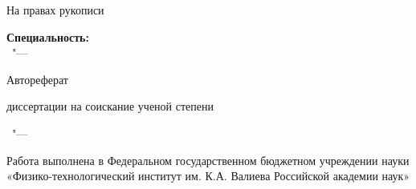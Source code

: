 \newcommand{\sfs}{\fontsize{14pt}{15pt}\selectfont}
\thispagestyle{empty}

\vspace{0pt plus1fill} %
\begin{flushright}
  \large{На правах рукописи}
\end{flushright}

\vspace{0pt plus3fill} %
\begin{center}
{\large \thesisAuthor}
\end{center}

\vspace{0pt plus3fill} %
\begin{center}
\textbf {\Large \thesisTitle}

\vspace{0pt plus3fill} %
\textbf {\large Специальность:} \\ 
{\large \thesisSpecialtyNumber\ "--- \thesisSpecialtyTitle}

\vspace{0pt plus1.5fill} %
\Large{Автореферат}\par
\large{диссертации на соискание ученой степени\par \thesisDegree}
\end{center}

\vspace{0pt plus4fill} %
\begin{center}
{\large{\thesisCity\ "--- \thesisYear}}
\end{center}

\newpage
\thispagestyle{empty}

{}

\noindent Работа выполнена в Федеральном государственном бюджетном учреждении \linebreak науки «Физико-технологический институт им. К.А. Валиева Российской \linebreak академии наук»

